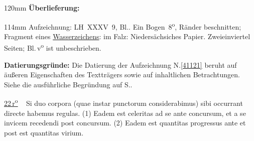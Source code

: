 \begin{ledgroupsized}[r]{120mm}
\footnotesize
\pstart
\noindent\textbf{Überlieferung:}
\pend
\end{ledgroupsized}
\begin{ledgroupsized}[r]{114mm}
\footnotesize
\pstart \parindent -6mm
%
Aufzeichnung:
LH~XXXV~9, Bl.. 
Ein Bogen~8\textsuperscript{o},
Ränder beschnitten;
Fragment eines \href{\Scan{LH_35_09_07_022-023wz}}{Wasserzeichens}: im Falz:
Niedersächsiches Papier.
Zweieinviertel Seiten;
Bl.\,v\textsuperscript{o} ist unbeschrieben.
\pend
\end{ledgroupsized}
\vspace{3.5mm}
\begin{ledgroup}
\footnotesize
\pstart
\noindent%
\textbf{Datierungsgründe:}
Die Datierung der Aufzeichnung N.\;\ref{41121} beruht auf äußeren Eigenschaften des Text\-trägers %
sowie auf inhaltlichen Betrachtungen.
Siehe die ausführliche Begründung auf S.\;\pageref{41121_dat}.
\pend
\end{ledgroup}
\frenchspacing%
\vspace{5mm}
\pstart%
\normalsize%
\noindent%
\lbrack%
\href{\Scan{LH_35_09_07_022r}}%
{22\,r\textsuperscript{o}}%
\rbrack\ %
Si duo corpora%
(quae instar punctorum considerabimus)%
sibi occurrant directe%
habemus regulas.%
(1)
Eadem est celeritas ad se%
ante concursum,
et a se invicem recedendi%
post concursum.%
(2)
Eadem est quantitas progressus%
%
ante et post
est quantitas virium.%
